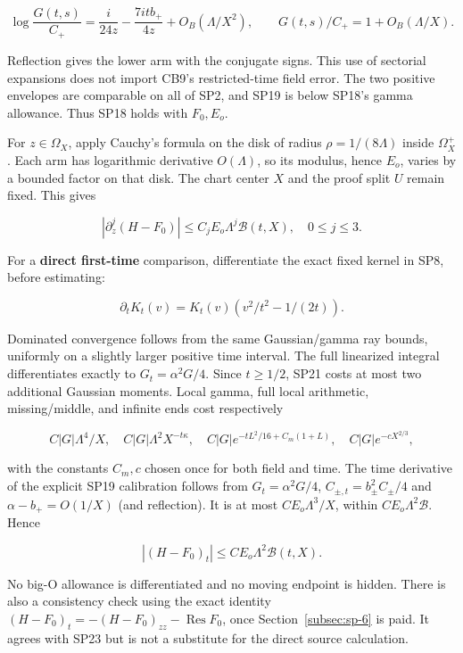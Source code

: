 \[
\log\frac{G(t,s)}{C_+}
 =\frac{i}{24z}-\frac{7it b_+}{4z}+O_B(\Lambda/X^2),
\qquad G(t,s)/C_+=1+O_B(\Lambda/X).
\tag{SP19}\label{eq:ansatz-sp19}
\]

Reflection gives the lower arm with the conjugate signs. This use of sectorial expansions does not import CB9's restricted-time field error. The two positive envelopes are comparable on all of SP2, and SP19 is below SP18's gamma allowance. Thus SP18 holds with \(F_0,E_{o}\).

For \(z\in \Omega_X\), apply Cauchy's formula on the disk of radius \(\rho=1/(8 \Lambda)\) inside \(\Omega_{X}^+\). Each arm has logarithmic derivative \(O(\Lambda)\), so its modulus, hence \(E_{o}\), varies by a bounded factor on that disk. The chart center \(X\) and the proof split \(U\) remain fixed. This gives

\[
|\partial_z^j(H-F_0)|\le C_jE_o\Lambda^j\mathcal B(t,X),
\quad0\le j\le3.
\tag{SP20}\label{eq:ansatz-sp20}
\]

For a \textbf{direct first-time} comparison, differentiate the exact fixed kernel in SP8, before estimating:

\[
\partial_t K_t(v)=K_t(v)\left(v^2/t^2-1/(2t)\right).
\tag{SP21}\label{eq:ansatz-sp21}
\]

Dominated convergence follows from the same Gaussian/gamma ray bounds, uniformly on a slightly larger positive time interval. The full linearized integral differentiates exactly to \(G_{t}=\alpha^{2} G/4\). Since \(t\ge 1/2\), SP21 costs at most two additional Gaussian moments. Local gamma, full local arithmetic, missing/middle, and infinite ends cost respectively

\[
C|G|\Lambda^4/X,\quad C|G|\Lambda^2X^{-t\kappa},\quad
C|G|e^{-tL^2/16+C_m(1+L)},\quad C|G|e^{-cX^{2/3}},
\tag{SP22}\label{eq:ansatz-sp22}
\]

with the constants \(C_{m},c\) chosen once for both field and time. The time derivative of the explicit SP19 calibration follows from \(G_{t}=\alpha^{2}G/4\), \(C_{\pm,t}=b_\pm^{2} C_\pm/4\) and \(\alpha-b_+=O(1/X)\) (and reflection). It is at most \(C E_{o} \Lambda^{3}/X\), within \(C E_{o} \Lambda^{2} \mathcal B\). Hence

\[
|(H-F_0)_t|\le C E_o\Lambda^2\mathcal B(t,X).
\tag{SP23}\label{eq:ansatz-sp23}
\]

No big-O allowance is differentiated and no moving endpoint is hidden. There is also a consistency check using the exact identity \((H-F_0)_{t}=-(H-F_0)_{zz}-\operatorname{Res} F_0\), once Section~\ref{subsec:sp-6} is paid. It agrees with SP23 but is not a substitute for the direct source calculation.

